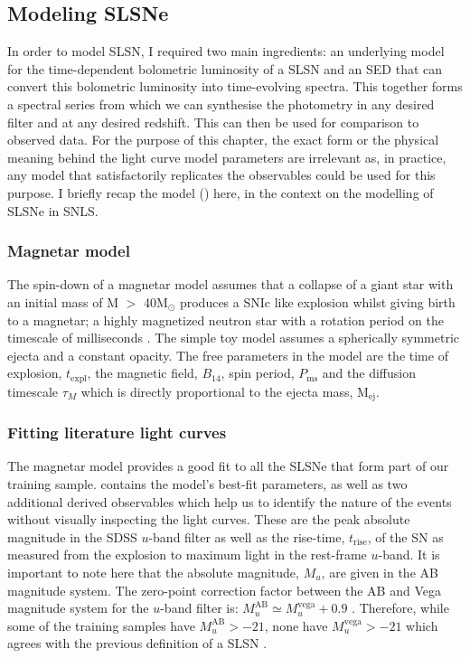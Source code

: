 \subsection{Modeling SLSNe}
In order to model SLSN, I required two main ingredients: an underlying model for the time-dependent bolometric luminosity of a SLSN and an SED that can convert this bolometric luminosity into time-evolving spectra. This together forms a spectral series from which we can synthesise the photometry in any desired filter and at any desired redshift. This can then be used for comparison to observed data. For the purpose of this chapter, the exact form or the physical meaning behind the light curve model parameters are irrelevant as, in practice, any model that satisfactorily replicates the observables could be used for this purpose. I briefly recap the model () here, in the context on the modelling of SLSNe in SNLS.

\subsubsection{Magnetar model}
The spin-down of a magnetar model assumes that a collapse of a giant star with an initial mass of M $>$ 40M$_{\odot}$ produces a SNIc like explosion whilst giving birth to a magnetar; a highly magnetized neutron star with a rotation period on the timescale of milliseconds \citep{Kasen2009,Woosley2010,Inserra2013}. The simple toy model assumes a spherically symmetric ejecta and a constant opacity. The free parameters in the model are the time of explosion, $t_{\mathrm{expl}}$, the magnetic field, $B_{14}$, spin period, $P_{\mathrm{ms}}$ and the diffusion timescale $\tau_M$ which is directly proportional to the ejecta mass, M$_{\mathrm{ej}}$.

\subsubsection{Fitting literature light curves}
The magnetar model provides a good fit to all the SLSNe that form part of our training sample.  contains the model's best-fit parameters, as well as two additional derived observables which help us to identify the nature of the events without visually inspecting the light curves. These are the peak absolute magnitude in the SDSS $u$-band filter as well as the rise-time, $t_\mathrm{rise}$, of the SN as measured from the explosion to maximum light in the rest-frame $u$-band. It is important to note here that the absolute magnitude, $M_u$, are given in the AB magnitude system. The zero-point correction factor between the AB and Vega magnitude system for the $u$-band filter is: $M_u^{\mathrm{AB}}\simeq M_u^{\mathrm{vega}}+0.9$ \citep{Blanton2007}. Therefore, while some of the training samples have $M_u^{\mathrm{AB}}>-21$, none have $M_u^{\mathrm{vega}}>-21$ which agrees with the previous definition of a SLSN \citep{Gal-Yam2012}.

